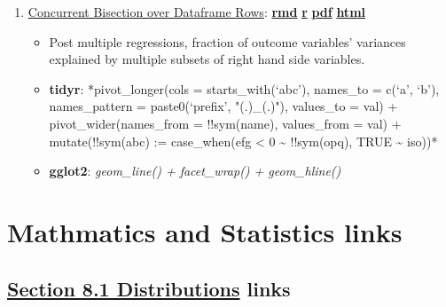 \documentclass[
]{book}
\providecommand{\tightlist}{%
  \setlength{\itemsep}{0pt}\setlength{\parskip}{0pt}}
\begin{document}
\begin{enumerate}
\def\labelenumi{\arabic{enumi}.}
\tightlist
\item
  \href{https://fanwangecon.github.io/R4Econ/optimization/root_bisect/htmlpdfr/fs_bisec_joint.html}{Concurrent Bisection over Dataframe Rows}: \href{https://github.com/FanWangEcon/R4Econ/blob/master/optimization/root_bisect//fs_bisec_joint.Rmd}{\textbf{rmd}} \textbar{} \href{https://github.com/FanWangEcon/R4Econ/blob/master/optimization/root_bisect/htmlpdfr/fs_bisec_joint.R}{\textbf{r}} \textbar{} \href{https://github.com/FanWangEcon/R4Econ/blob/master/optimization/root_bisect/htmlpdfr/fs_bisec_joint.pdf}{\textbf{pdf}} \textbar{} \href{https://fanwangecon.github.io/R4Econ/optimization/root_bisect/htmlpdfr/fs_bisec_joint.html}{\textbf{html}}

  \begin{itemize}
  \tightlist
  \item
    Post multiple regressions, fraction of outcome variables' variances explained by multiple subsets of right hand side variables.
  \item
    \textbf{tidyr}: *pivot\_longer(cols = starts\_with(`abc'), names\_to = c(`a', `b'), names\_pattern = paste0(`prefix', "(.)\_(.)"), values\_to = val) + pivot\_wider(names\_from = !!sym(name), values\_from = val) + mutate(!!sym(abc) := case\_when(efg \textless{} 0 \textasciitilde{} !!sym(opq), TRUE \textasciitilde{} iso))*
  \item
    \textbf{gglot2}: \emph{geom\_line() + facet\_wrap() + geom\_hline()}
  \end{itemize}
\end{enumerate}

\hypertarget{mathmatics-and-statistics-links}{%
\section{Mathmatics and Statistics links}\label{mathmatics-and-statistics-links}}

\hypertarget{section-8.1-distributionsdistributions-links}{%
\subsection{\texorpdfstring{\protect\hyperlink{distributions}{Section 8.1 Distributions} links}{Section 8.1 Distributions links}}\label{section-8.1-distributionsdistributions-links}}
\end{document}
